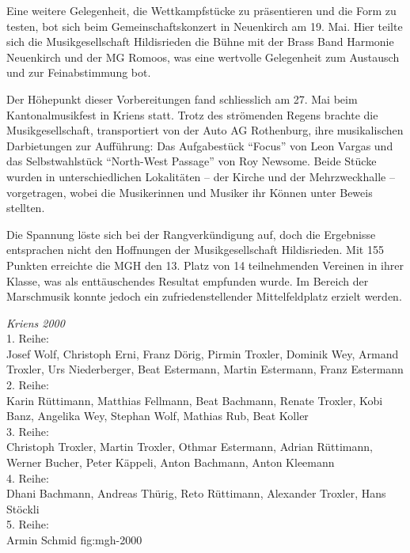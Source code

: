 \begin{history}
    Eine weitere Gelegenheit, die Wettkampfstücke zu präsentieren und die Form
    zu testen, bot sich beim Gemeinschaftskonzert in Neuenkirch am 19. Mai. Hier
    teilte sich die Musikgesellschaft Hildisrieden die Bühne mit der Brass Band
    Harmonie Neuenkirch und der MG Romoos, was eine wertvolle Gelegenheit zum
    Austausch und zur Feinabstimmung bot.

    Der Höhepunkt dieser Vorbereitungen fand schliesslich am 27. Mai beim
    Kantonalmusikfest in Kriens statt. Trotz des strömenden Regens brachte die
    Musikgesellschaft, transportiert von der Auto AG Rothenburg, ihre
    musikalischen Darbietungen zur Aufführung: Das Aufgabestück \enquote{Focus}
    von Leon Vargas und das Selbstwahlstück \enquote{North-West Passage} von Roy
    Newsome. Beide Stücke wurden in unterschiedlichen Lokalitäten -- der Kirche
    und der Mehrzweckhalle -- vorgetragen, wobei die Musikerinnen und Musiker
    ihr Können unter Beweis stellten.

    Die Spannung löste sich bei der Rangverkündigung auf, doch die Ergebnisse
    entsprachen nicht den Hoffnungen der Musikgesellschaft Hildisrieden. Mit 155
    Punkten erreichte die MGH den 13. Platz von 14 teilnehmenden Vereinen in
    ihrer Klasse, was als enttäuschendes Resultat empfunden wurde. Im Bereich
    der Marschmusik konnte jedoch ein zufriedenstellender Mittelfeldplatz
    erzielt werden.

\end{history}





{\emph{Kriens 2000}\\
    1. Reihe:\\
    Josef Wolf, Christoph Erni, Franz Dörig, Pirmin Troxler, Dominik Wey, Armand
    Troxler, Urs Niederberger, Beat Estermann, Martin Estermann, Franz
    Estermann\\
    2. Reihe:\\
    Karin Rüttimann, Matthias Fellmann, Beat Bachmann, Renate Troxler, Kobi
    Banz, Angelika Wey, Stephan Wolf, Mathias Rub, Beat Koller\\
    3. Reihe:\\
    Christoph Troxler, Martin Troxler, Othmar Estermann, Adrian Rüttimann,
    Werner Bucher, Peter Käppeli, Anton Bachmann, Anton Kleemann\\
    4. Reihe:\\
    Dhani Bachmann, Andreas Thürig, Reto Rüttimann, Alexander Troxler, Hans
    Stöckli\\
    5. Reihe:\\
    Armin Schmid } {fig:mgh-2000}

